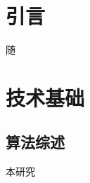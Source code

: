 \documentclass{article}
\begin{document}
\newpage
\pagestyle{plain}
\tableofcontents


\newpage
\pagestyle{fancy}
\fancyhf{}               %
\renewcommand{\headrulewidth}{0pt} %
 \setcounter{page}{1} %

\section{引言}
  随    
\section{技术基础}
  \subsection{算法综述}
    本研究\cite{mishra2022drone}


  
\label{EndBody}        


\newpage
\pagestyle{empty}





\end{document}
